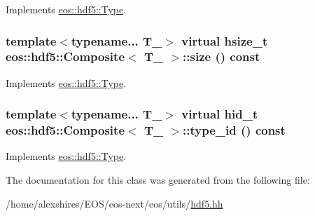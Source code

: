 Implements \hyperlink{structeos_1_1hdf5_1_1Type_a79de1c9f0444de59864107c388c23d2d}{eos::hdf5::Type}.\hypertarget{classeos_1_1hdf5_1_1Composite_a67ce4870971aced7cf83a7a88c16c61d}{
\subsubsection[{size}]{\setlength{\rightskip}{0pt plus 5cm}template$<$typename... T\_\-$>$ virtual hsize\_\-t {\bf eos::hdf5::Composite}$<$ T\_\- $>$::size () const}}
\label{classeos_1_1hdf5_1_1Composite_a67ce4870971aced7cf83a7a88c16c61d}


Implements \hyperlink{structeos_1_1hdf5_1_1Type_a0cf79b090412bb228a1df8349acf3c2b}{eos::hdf5::Type}.\hypertarget{classeos_1_1hdf5_1_1Composite_a97743d3126f849b6359587508b488a38}{
\subsubsection[{type\_\-id}]{\setlength{\rightskip}{0pt plus 5cm}template$<$typename... T\_\-$>$ virtual {\bf hid\_\-t} {\bf eos::hdf5::Composite}$<$ T\_\- $>$::type\_\-id () const}}
\label{classeos_1_1hdf5_1_1Composite_a97743d3126f849b6359587508b488a38}


Implements \hyperlink{structeos_1_1hdf5_1_1Type_a0305c470a7a26a391f9a751e40bb9ff6}{eos::hdf5::Type}.

The documentation for this class was generated from the following file:\begin{DoxyCompactItemize}
\item 
/home/alexshires/EOS/eos-\/next/eos/utils/\hyperlink{hdf5_8hh}{hdf5.hh}\end{DoxyCompactItemize}
